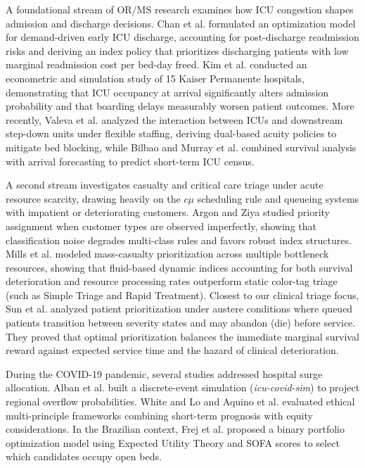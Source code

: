 \documentclass[final,5p,times,twocolumn]{elsarticle}
\begin{document}
A foundational stream of OR/MS research examines how ICU congestion shapes admission and discharge decisions. Chan et al. \cite{chan2012optimizing} formulated an optimization model for demand-driven early ICU discharge, accounting for post-discharge readmission risks and deriving an index policy that prioritizes discharging patients with low marginal readmission cost per bed-day freed. Kim et al. \cite{kim2015association} conducted an econometric and simulation study of 15 Kaiser Permanente hospitals, demonstrating that ICU occupancy at arrival significantly alters admission probability and that boarding delays measurably worsen patient outcomes. More recently, Valeva et al. \cite{Valeva_2023} analyzed the interaction between ICUs and downstream step-down units under flexible staffing, deriving dual-based acuity policies to mitigate bed blocking, while Bilbao \cite{Bilbao_2022} and Murray et al. \cite{Murray_2023} combined survival analysis with arrival forecasting to predict short-term ICU census.

A second stream investigates casualty and critical care triage under acute resource scarcity, drawing heavily on the $c\mu$ scheduling rule \cite{buyukkoc1985cmu} and queueing systems with impatient or deteriorating customers. Argon and Ziya \cite{argon2009priority} studied priority assignment when customer types are observed imperfectly, showing that classification noise degrades multi-class rules and favors robust index structures. Mills et al. \cite{mills2013resource} modeled mass-casualty prioritization across multiple bottleneck resources, showing that fluid-based dynamic indices accounting for both survival deterioration and resource processing rates outperform static color-tag triage (such as Simple Triage and Rapid Treatment). Closest to our clinical triage focus, Sun et al. \cite{sun2018patient} analyzed patient prioritization under austere conditions where queued patients transition between severity states and may abandon (die) before service. They proved that optimal prioritization balances the immediate marginal survival reward against expected service time and the hazard of clinical deterioration.

During the COVID-19 pandemic, several studies addressed hospital surge allocation. Alban et al. \cite{Alban_2020} built a discrete-event simulation (\textit{icu-covid-sim}) to project regional overflow probabilities. White and Lo \cite{White_2021} and Aquino et al. \cite{aquino2022ethical} evaluated ethical multi-principle frameworks combining short-term prognosis with equity considerations. In the Brazilian context, Frej et al. \cite{Frej_2021, Frej_2023} proposed a binary portfolio optimization model using Expected Utility Theory and SOFA scores to select which candidates occupy open beds.
\end{document}
